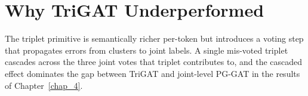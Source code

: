 \section{Why TriGAT Underperformed}
\label{sec_disc_trigat}

The triplet primitive is semantically richer per-token but introduces a voting step that propagates errors from clusters to joint labels. A single mis-voted triplet cascades across the three joint votes that triplet contributes to, and the cascaded effect dominates the gap between TriGAT and joint-level PG-GAT in the results of Chapter~\ref{chap_4}.
